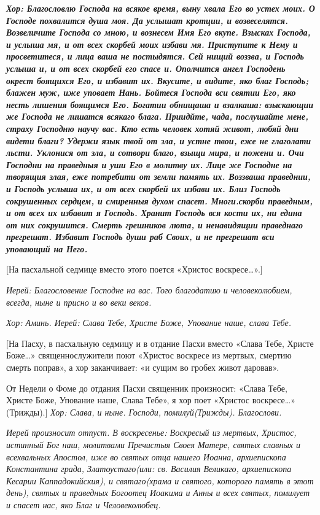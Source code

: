 \bfseries  \normalfont{}\itshape  Хор:\normalfont{} Благословлю Господа на всякое время, выну хвала Его во устех моих. О Господе похвалится душа моя. Да услышат кротции, и возвеселятся. Возвеличите Господа со мною, и вознесем Имя Его вкупе. Взысках Господа, и услыша мя, и от всех скорбей моих избави мя. Приступите к Нему и просветитеся, и лица ваша не постыдятся. Сей нищий воззва, и Господь услыша и, и от всех скорбей его спасе и. Ополчится ангел Господень окрест боящихся Его, и избавит их. Вкусите, и видите, яко благ Господь; блажен муж, иже уповает Нань. Бойтеся Господа вси святии Его, яко несть лишения боящимся Его. Богатии обнищаша и взалкаша: взыскающии же Господа не лишатся всякаго блага. Приидйте, чада, послушайте мене, страху Господню научу вас. Кто есть человек хотяй живот, любяй дни видети благи? Удержи язык твой от зла, и устне твои, еже не глаголати льсти. Уклонися от зла, и сотвори благо, взыщи мира, и пожени и. Очи Господни на праведныя и уши Его в молитву их. Лице же Господне на творящия злая, еже потребити от земли память их. Воззваша праведнии, и Господь услыша их, и от всех скорбей их избави их. Близ Господь сокрушенных сердцем, и смиренныя духом спасет. Многи.скорби праведным, и от всех их избавит я Господь. Хранит Господь вся кости их, ни едина от них сокрушится. Смерть грешников люта, и ненавидящии праведнаго прегрешат. Избавит Господь души раб Своих, и не прегрешат вси уповающий на Него.


  [На пасхальной седмице вместо этого поется «Христос воскресе…».]


 \itshape  Иерей:\normalfont{} Благословение Господне на вас. Того благодатию и человеколюбием, всегда, ныне и присно и во веки веков.


\itshape  Хор:\normalfont{} Аминь. \itshape  Иерей:\normalfont{} Слава Тебе, Христе Боже, Упование наше, слава Тебе.


    [На Пасху, в пасхальную седмицу и в отдание Пасхи вместо «Слава Тебе, Христе Боже…» священнослужители поют «Христос воскресе из мертвых, смертию смерть поправ», а хор заканчивает: «и сущим во гробех живот даровав». 


    От Недели о Фоме до отдания Пасхи священник произносит: «Слава Тебе, Христе Боже, Упование наше, Слава Тебе», я хор поет «Христос воскресе…» (Трижды).] \itshape  Хор: Слава, и ныне.\normalfont{} Господи, помилуй\itshape  (Трижды).\normalfont{} Благослови. 




\itshape  Иерей произносит отпуст. В воскресенье:\normalfont{} Воскресый из мертвых, Христос, истинный Бог наш, молитвами Пречистыя Своея Матере, святых славных и всехвальных Апостол, иже во святых отца нашего Иоанна, архиепископа Константина града, Златоустаго\itshape  (или:\normalfont{} св. Василия Великаго, архиепископа Кесарии Каппадокийския), и святаго\itshape  (храма и святого, которого память в этот день),\normalfont{} святых и праведных Богоотец Иоакима и Анны и всех святых, помилует и спасет нас, яко Благ и Человеколюбец.



